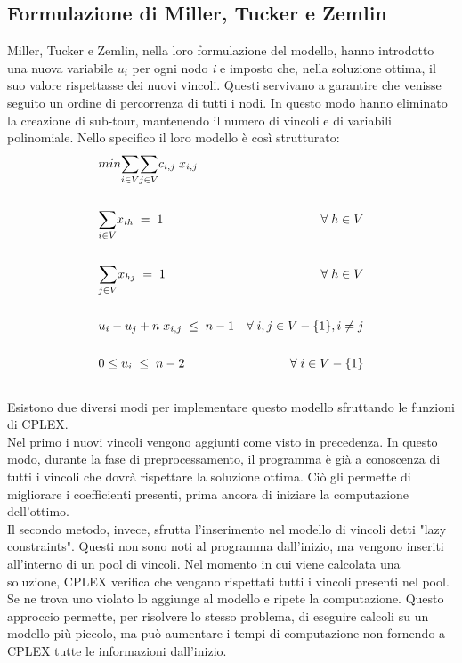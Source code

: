 \subsection{Formulazione di Miller, Tucker e Zemlin}
Miller, Tucker e Zemlin, nella loro formulazione del modello, hanno introdotto una nuova variabile $u_i$ per ogni nodo \textit{i} e imposto che, nella soluzione ottima, il suo valore  rispettasse dei nuovi vincoli. Questi servivano a garantire che venisse seguito un ordine di percorrenza di tutti i nodi. In questo modo hanno eliminato la creazione di sub-tour, mantenendo il numero di vincoli e di variabili polinomiale. Nello specifico il loro modello è così strutturato:
\begin{align}
& min \underset{i\in V}\sum{}\underset{j\in V}\sum{c_{i,j}\; x_{i,j}} \\ \notag \\
& \underset{i\in V}\sum{x_{ih}}\; =\; 1 & \forall\; h\in V \\ \notag \\
& \underset{j\in V}\sum{x_{hj}}\; =\; 1 & \forall\; h\in V \\ \notag \\
& u_i-u_j+n\; x_{i,j}\;\leq\; n-1 & \forall\; i,j\in V-\{ 1\} , i\neq j \\ \notag \\
& 0\leq u_i\;\leq\; n-2 & \forall\; i\in V-\{ 1\} \\ \notag 
\end{align}
Esistono due diversi modi per implementare questo modello sfruttando le funzioni di CPLEX.\\
Nel primo i nuovi vincoli vengono aggiunti come visto in precedenza. In questo modo, durante la fase di preprocessamento, il programma è già a conoscenza di tutti i vincoli che dovrà rispettare la soluzione ottima. Ciò gli permette di migliorare i coefficienti presenti, prima ancora di iniziare la computazione dell'ottimo.\\
Il secondo metodo, invece, sfrutta l'inserimento nel modello di vincoli detti "lazy constraints". Questi non sono noti al programma dall'inizio, ma vengono inseriti all'interno di un pool di vincoli. Nel momento in cui viene calcolata una soluzione, CPLEX verifica che vengano rispettati tutti i vincoli presenti nel pool. Se ne trova uno violato lo aggiunge al modello e ripete la computazione. Questo approccio permette, per risolvere lo stesso problema, di eseguire calcoli su un modello più piccolo, ma può aumentare i tempi di computazione non fornendo a CPLEX tutte le informazioni dall'inizio.   

